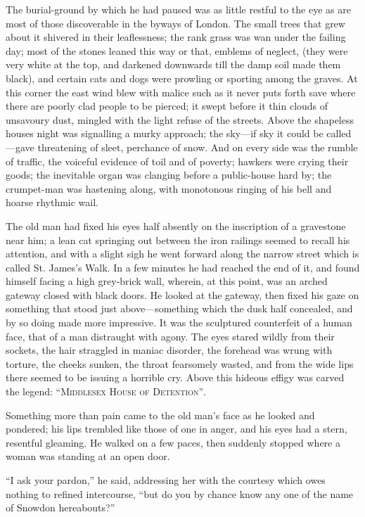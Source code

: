 {}The burial-ground by which he had paused was as little restful to the
eye as are most of those discoverable in the byways of London. The small
trees that grew about it shivered in their leaflessness; the rank grass
was wan under the failing day; most of the stones leaned this way or
that, emblems of neglect, (they were very white at the top, and darkened
downwards till the damp soil made them black), and certain cats and dogs
were prowling or sporting among the graves. At this corner the east wind
blew with malice such as it never puts forth save where there are poorly
clad people to be pierced; it swept before it thin clouds of unsavoury
dust, mingled with the light refuse of the streets. Above the shapeless
houses night was signalling a murky approach; the sky---if sky it could
be called---gave threatening of sleet, perchance of snow. And on every
side was the rumble of traffic, the voiceful evidence of toil and of
poverty; hawkers were crying their goods; the inevitable organ was
clanging before a public-house hard by; {}the crumpet-man was hastening
along, with monotonous ringing of his bell and hoarse rhythmic wail.

The old man had fixed his eyes half absently on the inscription of a
gravestone near him; a lean cat springing out between the iron railings
seemed to recall his attention, and with a slight sigh he went forward
along the narrow street which is called St. James's Walk. In a few
minutes he had reached the end of it, and found himself facing a high
grey-brick wall, wherein, at this point, was an arched gateway closed
with black doors. He looked at the gateway, then fixed his gaze on
something that stood just above---something which the dusk half
concealed, and by so doing made more impressive. It was the sculptured
counterfeit of a human face, that of a man distraught with agony. The
eyes stared wildly from their sockets, the hair straggled in maniac
disorder, the forehead was wrung with torture, the cheeks sunken, the
throat fearsomely wasted, and from the wide lips there seemed to be
issuing a {}horrible cry. Above this hideous effigy was carved the
legend: \textsc{``Middlesex House of Detention''}.

Something more than pain came to the old man's face as he looked and
pondered; his lips trembled like those of one in anger, and his eyes had
a stern, resentful gleaming. He walked on a few paces, then suddenly
stopped where a woman was standing at an open door.

``I ask your pardon,'' he said, addressing her with the courtesy which
owes nothing to refined intercourse, ``but do you by chance know any one
of the name of Snowdon hereabouts?''

